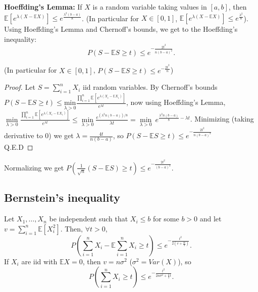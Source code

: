 \documentclass[11pt, english]{article}
\begin{document}
\textbf{Hoeffding's Lemma:} If $X$ is a random variable taking values in $[a,b]$, then $\mathbb{E}[e^{\lambda(X-\mathbb{E}X)}]\leq e^{\frac{\lambda^2(b-a)}{8}}$.
(In particular for $X\in[0,1]$, $\mathbb{E}[e^{\lambda(X-\mathbb{E}X)}]\leq e^{\frac{\lambda^2}{8}}$).\\

Using Hoeffding's Lemma and Chernoff's bounds, we get to the Hoeffding's inequality:
\begin{equation}
	P(S-\mathbb{E}S\geq t)\leq e^{-\frac{2t^2}{n(b-a)^2}}.
\end{equation}

(In particular for $X\in[0,1]$, $P(S-\mathbb{E}S\geq t)\leq e^{-\frac{2t^2}{n}}$)

\begin{proof}
	Let $S = \sum_{i=1}^{n}X_i$ iid random variables. By Chernoff's bounds $P(S-\mathbb{E}S\geq t)\leq \underset{\lambda>0}{\text{min}}\frac{\prod\limits_{i=1}^n \mathbb{E}[e^{\lambda(X_i-\mathbb{E}X_i)}]}{e^{\lambda t}}$, now using Hoeffding's Lemma, $\underset{\lambda>0}{\min}\frac{\prod\limits_{i=1}^n \mathbb{E}[e^{\lambda(X_i-\mathbb{E}X_i)}]}{e^{\lambda t}}\leq \underset{\lambda>0}{\min}\frac{e^{(\lambda^2 n(b-a))/8}}{\lambda t}=\underset{\lambda>0}{\min}\ e^{\frac{\lambda^2n(b-a)}{8}-\lambda t}$. Minimizing (taking derivative to 0) we get $\lambda=\frac{4t}{n(b-a)}$, so $P(S-\mathbb{E}S\geq t)\leq e^{-\frac{2t^2}{n(b-a)^2}}$\\
	Q.E.D
\end{proof}

Normalizing we get $P(\frac{1}{\sqrt{n}}(S-\mathbb{E}S)\geq t)\leq e^{-\frac{2t^2}{(b-a)^2}}$.

\subsection*{Bernstein's inequality}

Let $X_1,\dots,X_n$ be independent such that $X_i\leq b$ for some $b > 0$ and let $v=\sum\limits_{i=1}^n\mathbb{E}[X_i^2]$. Then, $\forall t>0$,
\begin{equation}
	P(\sum\limits_{i=1}^n X_i - \mathbb{E}\sum\limits_{i=1}^n X_i \geq t)\leq e^{-\frac{t^2}{2(v+\frac{bt}{3})}}.
\end{equation}
If $X_i$ are iid with $\mathbb{E}X=0$, then $v=n\sigma^2$ ($\sigma^2=Var(X)$), so
\begin{equation}
	P(\sum\limits_{i=1}^n X_i\geq t)\leq e^{-\frac{t^2}{2n\sigma^2+\frac{2}{3}t}}.
\end{equation} 
\end{document}

